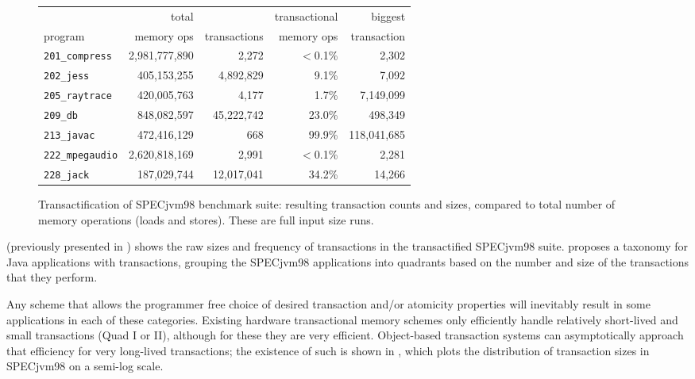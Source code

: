 \documentclass{csa-sig-alternate}
\begin{document}
\begin{figure*}
\begin{center}
\begin{tabular}{lrrrr}
        & total      &              & transactional & biggest\\
program & memory ops & transactions & memory ops    & transaction \\\hline
{\tt 201\_compress} & 2,981,777,890 & 2,272 & $<$0.1\% & 2,302 \\
{\tt 202\_jess} & 405,153,255 & 4,892,829 & 9.1\% & 7,092 \\
{\tt 205\_raytrace} & 420,005,763 & 4,177 & 1.7\% & 7,149,099 \\
{\tt 209\_db} & 848,082,597 & 45,222,742 & 23.0\% & 498,349 \\
{\tt 213\_javac} & 472,416,129 & 668 & 99.9\% & 118,041,685 \\
{\tt 222\_mpegaudio} & 2,620,818,169 & 2,991 & $<$0.1\% & 2,281 \\
{\tt 228\_jack} & 187,029,744 & 12,017,041 & 34.2\% & 14,266 \\
\end{tabular}
\end{center}
\figadjust%
\caption{Transactification of SPECjvm98 benchmark suite: resulting
  transaction counts and sizes, compared to total number of memory
  operations (loads and stores).  These are full input size runs.
}\label{fig:perfnums}
\end{figure*}

 (previously presented in \cite{AnanianAsKuLeLi04}) shows the raw sizes and frequency of transactions in
the transactified SPECjvm98 suite.
 proposes a
taxonomy for Java applications with transactions, grouping the SPECjvm98
applications into quadrants based on the number and size of the
transactions that they perform.


Any scheme that allows the programmer free choice of
desired transaction and/or atomicity properties will inevitably result
in some applications in each of these categories.  Existing
hardware transactional memory schemes only efficiently handle
relatively short-lived and small transactions (Quad I or II),
although for these they are very efficient.  Object-based
transaction systems can asymptotically approach that efficiency for
very long-lived transactions;  the existence of such is shown in
, which plots
the distribution of transaction sizes in SPECjvm98
on a semi-log scale.
\end{document}
